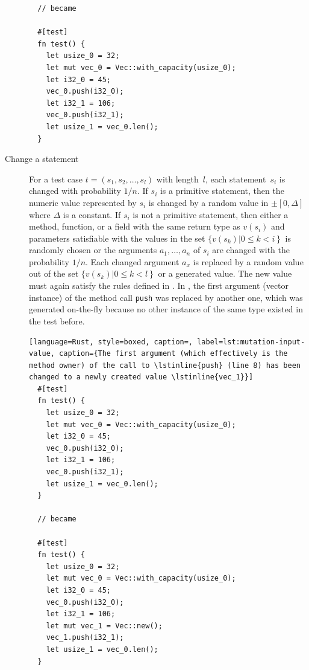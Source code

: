 \documentclass[paper=a4,%
  twoside,%
  BCOR4mm,%
  abstract=true,%
  toc=bibliography,%
  chapterprefix=true,%
  toc=bibliographynumbered,%
  open=right,%
  english,%
  pagesize=pdftex]{scrreprt}
\begin{document}
\begin{description}
\begin{lstlisting}
  // became

  #[test]
  fn test() {
    let usize_0 = 32;
    let mut vec_0 = Vec::with_capacity(usize_0);
    let i32_0 = 45;
    vec_0.push(i32_0);
    let i32_1 = 106;
    vec_0.push(i32_1);
    let usize_1 = vec_0.len();
  }
  \end{lstlisting}

  \item[Change a statement] For a test case $t = (s_1, s_2, \dots, s_l)$ with length~$l$, each statement~$s_i$ is changed with probability $1/n$. If $s_i$ is a primitive statement, then the numeric value represented by $s_i$ is changed by a random value in $\pm[0,\Delta]$ where $\Delta$ is a constant. If $s_i$ is not a primitive statement, then either a method, function, or a field with the same return type as $v(s_i)$ and parameters satisfiable with the values in the set $\{v(s_k) \left| 0 \leq k < i \right\}$ is randomly chosen or the arguments $a_1, \dots, a_n$ of $s_i$ are changed with the probability $1/n$. Each changed argument $a_x$ is replaced by a random value out of the set $\{v(s_k) \left| 0 \leq k < l \right\}$ or a generated value. The new value must again satisfy the rules defined in . In , the first argument (vector instance) of the method call \lstinline{push} was replaced by another one, which was generated on-the-fly because no other instance of the same type existed in the test before.

  \begin{lstlisting}[language=Rust, style=boxed, caption=, label=lst:mutation-input-value, caption={The first argument (which effectively is the method owner) of the call to \lstinline{push} (line 8) has been changed to a newly created value \lstinline{vec_1}}]
  #[test]
  fn test() {
    let usize_0 = 32;
    let mut vec_0 = Vec::with_capacity(usize_0);
    let i32_0 = 45;
    vec_0.push(i32_0);
    let i32_1 = 106;
    vec_0.push(i32_1);
    let usize_1 = vec_0.len();
  }

  // became

  #[test]
  fn test() {
    let usize_0 = 32;
    let mut vec_0 = Vec::with_capacity(usize_0);
    let i32_0 = 45;
    vec_0.push(i32_0);
    let i32_1 = 106;
    let mut vec_1 = Vec::new();
    vec_1.push(i32_1);
    let usize_1 = vec_0.len();
  }
  \end{lstlisting}


\end{description}
\end{document}
